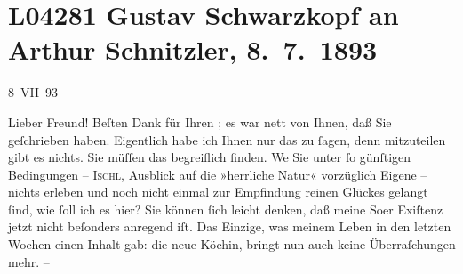 

\section[Gustav Schwarzkopf an Arthur Schnitzler, 8. 7. 1893]{L04281 Gustav Schwarzkopf an Arthur Schnitzler, 8. 7. 1893}
\nopagebreak{}
\rehead{ }\normalsize\beginnumbering{}
\toendnotes[C]{\smallbreak\pagebreak[2]}
\toendnotes[C]{\smallbreak}
\toendnotes[C]{\smallbreak}
\pstart
           \raggedleft{}{\pb}8 VII 93\pend
           
\pstart{}Lieber Freund!\pend\vspace{0.5em}
\pstart
           Beſten Dank für Ihren \label{K_L04281-1v}\label{K_L04281-1}; es war nett von Ihnen, daß Sie geſchrieben haben.
               Eigentlich habe ich Ihnen nur das zu{ }ſagen, denn mitzuteilen gibt es nichts. Sie
               müſſen das begreiflich finden. We{\geminationn} Sie unter{ }ſo
               günſtigen Bedingungen – \textsc{Ischl}, Ausblick auf die »herrliche Natur« vorzüglich Eigene –
               nichts erleben und noch nicht einmal zur Empfindung reinen Glückes gelangt{ }ſind, wie{ }ſoll ich {\pb}es hier? Sie können{ }ſich
               leicht denken, daß meine So{\geminationm}er Exiſtenz jetzt nicht
               beſonders anregend iſt. Das Einzige, was meinem Leben in den letzten Wochen einen
               Inhalt gab: die neue Köchin, bringt
               nun auch keine Überraſchungen mehr. –\pend
           
